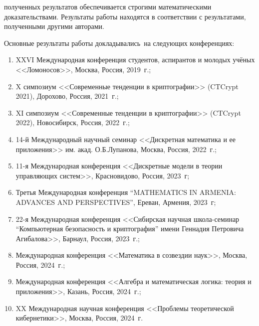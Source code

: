 {\reliability} полученных результатов обеспечивается строгими математическими доказательствами. 
Результаты работы находятся в соответствии с результатами, полученными другими авторами.


{\probation}
Основные результаты работы докладывались~на следующих конференциях:
\begin{enumerate}
    \item XXVI Международная конференция студентов, аспирантов и молодых учёных <<Ломоносов>>, Москва, Россия, 2019~г.;

    \item X симпозиум <<Современные тенденции в криптографии>> (CTCrypt 2021), Дорохово, Россия, 2021~г.;

    \item XI симпозиум <<Современные тенденции в криптографии>> (CTCrypt 2022), Новосибирск, Россия, 2022~г.;

    \item 14-й Международный научный семинар <<Дискретная математика и ее приложения>> им. акад. О.Б.Лупанова, Москва, Россия, 2022~г.;

    \item 11-я Международная конференция <<Дискретные модели в теории управляющих систем>>, Красновидово, Россия, 2023~г;

    \item Третья Международная конференция ``MATHEMATICS IN ARMENIA: ADVANCES AND PERSPECTIVES'', Ереван, Армения, 2023~г;

    \item 22-я Международная конференция <<Сибирская научная школа-семинар ``Компьютерная безопасность и криптография'' имени Геннадия Петровича Агибалова>>, Барнаул, Россия, 2023~г.;

    \item Международная конференция <<Математика в созвездии наук>>, Москва, Россия, 2024~г.;

    \item Международная конференция <<Алгебра и математическая логика: теория и приложения>>, Казань, Россия, 2024~г.;

    \item XX Международная научная конференция <<Проблемы теоретической кибернетики>>, Москва, Россия, 2024~г.
\end{enumerate}

